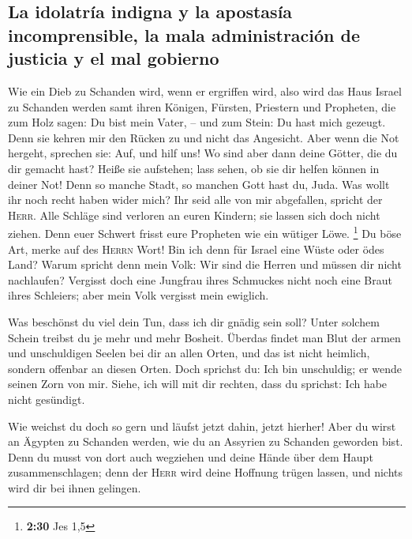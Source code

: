 \hypertarget{la-idolatruxeda-indigna-y-la-apostasuxeda-incomprensible-la-mala-administraciuxf3n-de-justicia-y-el-mal-gobierno}{%
\subsection{La idolatría indigna y la apostasía incomprensible, la mala
administración de justicia y el mal
gobierno}\label{la-idolatruxeda-indigna-y-la-apostasuxeda-incomprensible-la-mala-administraciuxf3n-de-justicia-y-el-mal-gobierno}}

 Wie ein Dieb zu Schanden wird, wenn er ergriffen wird,
also wird das Haus Israel zu Schanden werden samt ihren Königen,
Fürsten, Priestern und Propheten,  die zum Holz sagen: Du
bist mein Vater, -- und zum Stein: Du hast mich gezeugt. Denn sie kehren
mir den Rücken zu und nicht das Angesicht. Aber wenn die Not hergeht,
sprechen sie: Auf, und hilf uns!  Wo sind aber dann deine
Götter, die du dir gemacht hast? Heiße sie aufstehen; lass sehen, ob sie
dir helfen können in deiner Not! Denn so manche Stadt, so manchen Gott
hast du, Juda.  Was wollt ihr noch recht haben wider
mich? Ihr seid alle von mir abgefallen, spricht der \textsc{Herr}.
 Alle Schläge sind verloren an euren Kindern; sie lassen
sich doch nicht ziehen. Denn euer Schwert frisst eure Propheten wie ein
wütiger Löwe. \footnote{\textbf{2:30} Jes 1,5}  Du böse
Art, merke auf des \textsc{Herrn} Wort! Bin ich denn für Israel eine
Wüste oder ödes Land? Warum spricht denn mein Volk: Wir sind die Herren
und müssen dir nicht nachlaufen?  Vergisst doch eine
Jungfrau ihres Schmuckes nicht noch eine Braut ihres Schleiers; aber
mein Volk vergisst mein ewiglich.

 Was beschönst du viel dein Tun, dass ich dir gnädig sein
soll? Unter solchem Schein treibst du je mehr und mehr Bosheit.
 Überdas findet man Blut der armen und unschuldigen
Seelen bei dir an allen Orten, und das ist nicht heimlich, sondern
offenbar an diesen Orten.  Doch sprichst du: Ich bin
unschuldig; er wende seinen Zorn von mir. Siehe, ich will mit dir
rechten, dass du sprichst: Ich habe nicht gesündigt.

 Wie weichst du doch so gern und läufst jetzt dahin,
jetzt hierher! Aber du wirst an Ägypten zu Schanden werden, wie du an
Assyrien zu Schanden geworden bist.  Denn du musst von
dort auch wegziehen und deine Hände über dem Haupt zusammenschlagen;
denn der \textsc{Herr} wird deine Hoffnung trügen lassen, und nichts
wird dir bei ihnen gelingen.

